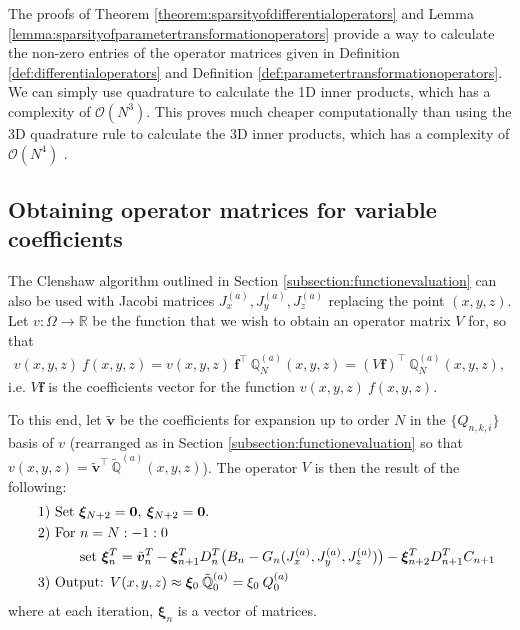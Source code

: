 \documentclass[11pt, oneside]{article}   	%
\newcommand{\bstodo}{\todo[color=pink]}
\newcommand{\bigO}{\mathcal{O}}
\newcommand{\R}{\mathbb{R}}
\newcommand{\scop}{Q}
\newcommand{\scopnki}{\scop_{n,k,i}}
\newcommand{\scopa}{\scop^{(a)}}
\newcommand{\bigscop}{{\mathbb{Q}}}
\newcommand{\bigscopa}{\bigscop^{(a)}}
\newcommand{\bigscopNa}{\bigscopa_{N}}
\newcommand{\bigscopt}{\mathbb{\tilde{Q}}}
\newcommand{\bigscopta}{\bigscopt^{(a)}}
\begin{document}
The proofs of Theorem \ref{theorem:sparsityofdifferentialoperators} and Lemma \ref{lemma:sparsityofparametertransformationoperators} provide a way to calculate the non-zero entries of the operator matrices given in Definition \ref{def:differentialoperators} and Definition \ref{def:parametertransformationoperators}. We can simply use quadrature to calculate the 1D inner products, which has a complexity of $\bigO(N^3)$. This proves much cheaper computationally than using the 3D quadrature rule to calculate the 3D inner products, which has a complexity of $\bigO(N^4)$ \bstodo{correct the O(nd) complexity}. 


\subsection{Obtaining operator matrices for variable coefficients}\label{subsection:operatorclenshaw}

The Clenshaw algorithm outlined in Section \ref{subsection:functionevaluation} can also be used with Jacobi matrices $J^{(a)}_x, J^{(a)}_y, J^{(a)}_z$ replacing the point $(x,y,z)$. Let $v : \Omega \to \R$ be the function that we wish to obtain an operator matrix $V$ for, so that
\begin{align*}
	v(x,y,z) \: f(x,y,z) = v(x,y,z) \: \bm{f}^\top \: \bigscopNa(x,y,z) = (V \bm{f})^\top \: \bigscopNa(x,y,z),
\end{align*}
i.e. $V \bm{f}$ is the coefficients vector for the function $v(x,y,z) \: f(x,y,z)$. 

To this end, let $\tilde{\bm{v}}$ be the coefficients for expansion up to order $N$ in the $\{\scopnki\}$ basis of $v$ (rearranged as in Section \ref{subsection:functionevaluation} so that $v(x,y,z) = \tilde{\bm{v}}^\top \: \bigscopta(x,y,z)$). The operator $V$ is then the result of the following:
\begin{align*}
	\quad &\text{1) } \text{Set } \bm{\xi}_{N+2} = \bold{0}, \: \bm{\xi}_{N+2} = \bold{0}. \\
	\quad &\text{2) } \text{For } n = N:-1:0 \\
	\quad & \quad \quad \quad \text{set } \bm{\xi}_{n}^T = {\tilde{\bm{v}}_n}^T - \bm{\xi}_{n+1}^T D^T_n \big(B_n - G_n(J^{(a)}_x, J^{(a)}_y, J^{(a)}_z)\big) -  \bm{\xi}_{n+2}^T D^T_{n+1}C_{n+1} \\
	\quad &\text{3) } \text{Output: } V(x,y,z) \approx \bm{\xi}_{0} \: \bigscopta_{0}  = \xi_{0} \: \scopa_0
\end{align*}
where at each iteration, $\bm{\xi}_n$ is a vector of matrices.
\end{document}
